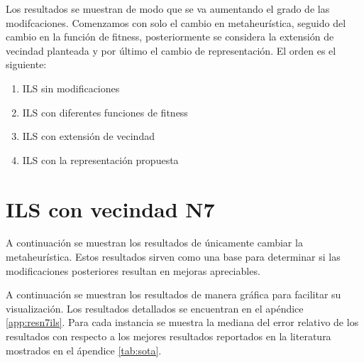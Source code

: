 Los resultados se muestran de modo que se va aumentando el grado de las modifcaciones. Comenzamos con solo el cambio en metaheurística, seguido del cambio en la función de fitness, posteriormente se considera la extensión de vecindad planteada y por último el cambio de representación. El orden es el siguiente:
\begin{enumerate}
    \item ILS sin modificaciones
    \item ILS con diferentes funciones de fitness 
    \item ILS con extensión de vecindad
    \item ILS con la representación propuesta
\end{enumerate}
\section{ILS con vecindad N7}
A continuación se muestran los resultados de únicamente cambiar la metaheurística. Estos resultados sirven como una base para determinar si las modificaciones posteriores resultan en mejoras apreciables.

A continuación se muestran los resultados de manera gráfica para facilitar su visualización. Los resultados detallados se encuentran en el apéndice \ref{app:resn7ils}. Para cada instancia se muestra la mediana del error relativo de los resultados con respecto a los mejores resultados reportados en la literatura mostrados en el ápendice \ref{tab:sota}. 

